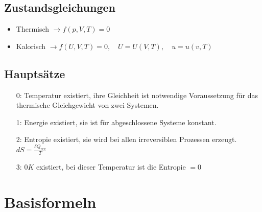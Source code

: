 \documentclass[twocolumn]{article}
\begin{document}
\subsection*{Zustandsgleichungen}
\begin{itemize}
	\item Thermisch $\rightarrow f(p, V, T) = 0$ 
	\item Kalorisch $\rightarrow f(U, V, T) = 0, \quad  U = U(V,T), \quad u = u(v,T)$ 
\end{itemize}

\subsection*{Hauptsätze}
\normalsize 
\begin{itemize}
	\item[0:] Temperatur existiert, ihre Gleichheit ist notwendige Voraussetzung für das thermische Gleichgewicht von zwei Systemen. 
	\item[1:] Energie existiert, sie ist für abgeschlossene Systeme konstant.  
	\item[2:] Entropie existiert, sie wird bei allen irreversiblen Prozessen erzeugt. $dS = \frac{\delta Q_{rev}}{T}$
	\item[3:] $0K$ existiert, bei dieser Temperatur ist die Entropie $= 0$ 
\end{itemize}

%                                                                

\section{Basisformeln}
\end{document}
